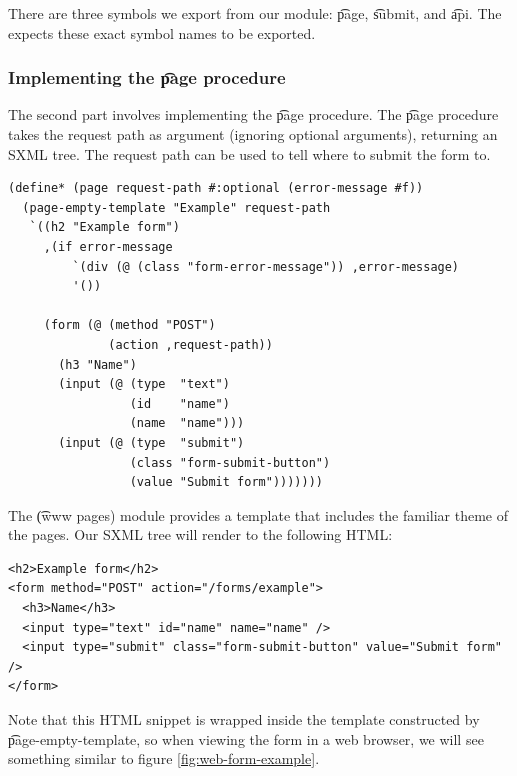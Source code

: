   There are three symbols we export from our module: \t{page}, \t{submit}, and
  \t{api}.  The  expects these exact symbol names to be
  exported.

\subsubsection{Implementing the \t{page} procedure}

  The second part involves implementing the \t{page} procedure. The \t{page}
  procedure takes the request path as argument (ignoring optional arguments),
  returning an SXML tree.  The request path can be used to tell where to
  submit the form to.

\begin{siderules}
\begin{verbatim}
(define* (page request-path #:optional (error-message #f))
  (page-empty-template "Example" request-path
   `((h2 "Example form")
     ,(if error-message
         `(div (@ (class "form-error-message")) ,error-message)
         '())

     (form (@ (method "POST")
              (action ,request-path))
       (h3 "Name")
       (input (@ (type  "text")
                 (id    "name")
                 (name  "name")))
       (input (@ (type  "submit")
                 (class "form-submit-button")
                 (value "Submit form")))))))
\end{verbatim}
\end{siderules}

  The \t{(www pages)} module provides a template that includes the familiar
  theme of the  pages.  Our SXML tree will render to the
  following HTML:

\begin{siderules}
\begin{verbatim}
<h2>Example form</h2>
<form method="POST" action="/forms/example">
  <h3>Name</h3>
  <input type="text" id="name" name="name" />
  <input type="submit" class="form-submit-button" value="Submit form" />
</form>
\end{verbatim}
\end{siderules}

  Note that this HTML snippet is wrapped inside the template constructed by
  \t{page-empty-template}, so when viewing the form in a web browser, we
  will see something similar to figure \ref{fig:web-form-example}.

